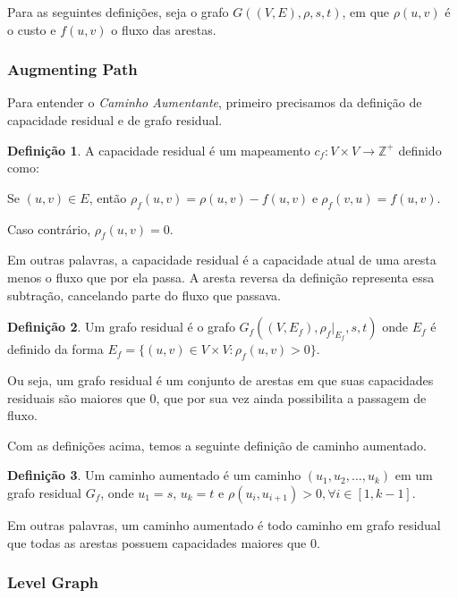 \documentclass[
	12pt,
	a4paper,
	twoside,
	brazil
]{article}
\theoremstyle{definition}
\newtheorem{definition}{Definição}
\begin{document}
	Para as seguintes definições, seja o grafo $G((V,E),\rho,s,t)$, em que $\rho(u,v)$ é o custo e $f(u,v)$ o fluxo das arestas.
	
	\subsubsection{Augmenting Path}
	
	Para entender o \textit{Caminho Aumentante}, primeiro precisamos da definição de capacidade residual e de grafo residual.
	
	\begin{definition}
	\label{residual-cap-def}
	A capacidade residual é um mapeamento $c_f \colon V \times V \to \mathbb{Z}^+$ definido como:
	
	Se $(u,v) \in E$, então $\rho_f(u,v) = \rho(u,v)-f(u,v) \; \mathrm{e} \; \rho_f(v,u) = f(u,v)$.
	
	Caso contrário, $\rho_f(u,v)=0$.
	\end{definition}

	Em outras palavras, a capacidade residual é a capacidade atual de uma aresta menos o fluxo que por ela passa. A aresta reversa da definição representa essa subtração, cancelando parte do fluxo que passava.
	
	\begin{definition}
	\label{residual-g-def}
	Um grafo residual é o grafo $G_f((V,E_f), \rho_f|_{E_f}, s,t)$ onde $E_f$ é definido da forma $E_f = \{(u,v) \in V \times V \colon \rho_f(u,v) > 0 \}$.
	\end{definition}

	Ou seja, um grafo residual é um conjunto de arestas em que suas capacidades residuais são maiores que $0$, que por sua vez ainda possibilita a passagem de fluxo.
	
	Com as definições acima, temos a seguinte definição de caminho aumentado.
	
	\begin{definition}
		\label{aug-path-def}
		Um caminho aumentado é um caminho $(u_1,u_2,\dots,u_k)$ em um grafo residual $G_f$, onde $u_1 = s$, $u_k = t$ e $\rho(u_i,u_{i+1}) > 0, \forall i \in [1, k-1]$.
	\end{definition}

	Em outras palavras, um caminho aumentado é todo caminho em grafo residual que todas as arestas possuem capacidades maiores que $0$.
	
	\subsubsection{Level Graph}
	
\end{document}
